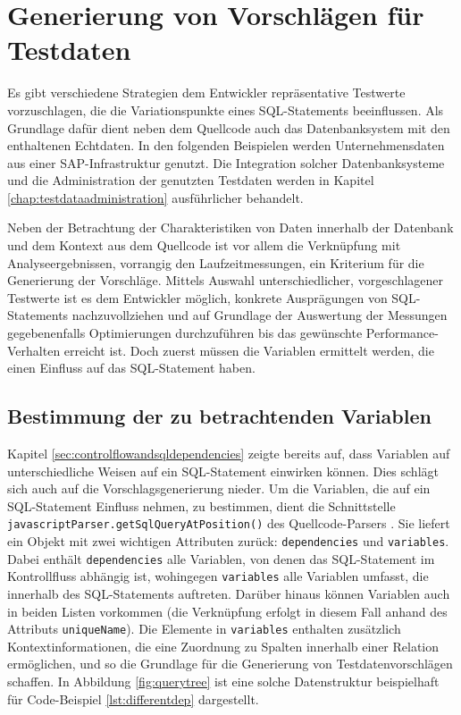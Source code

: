 \section{Generierung von Vorschlägen für Testdaten}\label{chap:testdatasuggestions}

Es gibt verschiedene Strategien dem Entwickler repräsentative Testwerte vorzuschlagen, die die Variationspunkte eines SQL-Statements beeinflussen.
Als Grundlage dafür dient neben dem Quellcode auch das Datenbanksystem mit den enthaltenen Echtdaten.
In den folgenden Beispielen werden Unternehmensdaten aus einer SAP-Infrastruktur genutzt.
Die Integration solcher Datenbanksysteme und die Administration der genutzten Testdaten werden in Kapitel \ref{chap:testdataadministration} ausführlicher behandelt.

Neben der Betrachtung der Charakteristiken von Daten innerhalb der Datenbank und dem Kontext aus dem Quellcode ist vor allem die Verknüpfung mit Analyseergebnissen, vorrangig den Laufzeitmessungen, ein Kriterium für die Generierung der Vorschläge.
Mittels Auswahl unterschiedlicher, vorgeschlagener Testwerte ist es dem Entwickler möglich, konkrete Ausprägungen von SQL-Statements nachzuvollziehen und auf Grundlage der Auswertung der Messungen gegebenenfalls Optimierungen durchzuführen bis das gewünschte Performance-Verhalten erreicht ist.
Doch zuerst müssen die Variablen ermittelt werden, die einen Einfluss auf das SQL-Statement haben.

\subsection{Bestimmung der zu betrachtenden Variablen}
Kapitel \ref{sec:controlflowandsqldependencies} zeigte bereits auf, dass Variablen auf unterschiedliche Weisen auf ein SQL-Statement einwirken können.
Dies schlägt sich auch auf die Vorschlagsgenerierung nieder.
Um die Variablen, die auf ein SQL-Statement Einfluss nehmen, zu bestimmen, dient die Schnittstelle \texttt{javascriptParser.getSqlQueryAtPosition()} des Quellcode-Parsers \cite{Horschig2014}.
Sie liefert ein Objekt mit zwei wichtigen Attributen zurück: \texttt{dependencies} und \texttt{variables}.
Dabei enthält \texttt{dependencies} alle Variablen, von denen das SQL-Statement im Kontrollfluss abhängig ist, wohingegen \texttt{variables} alle Variablen umfasst, die innerhalb des SQL-Statements auftreten.
Darüber hinaus können Variablen auch in beiden Listen vorkommen (die Verknüpfung erfolgt in diesem Fall anhand des Attributs \texttt{uniqueName}).
Die Elemente in \texttt{variables} enthalten zusätzlich Kontextinformationen, die eine Zuordnung zu Spalten innerhalb einer Relation ermöglichen, und so die Grundlage für die Generierung von Testdatenvorschlägen schaffen.
In Abbildung \ref{fig:querytree} ist eine solche Datenstruktur beispielhaft für Code-Beispiel \ref{lst:differentdep} dargestellt.

